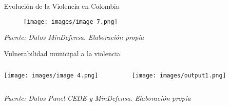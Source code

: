 


\begin{frame}{Evolución de la Violencia en Colombia}
    \begin{figure}[ht]
        \centering
        \texttt{[image: images/image 7.png]}
    \end{figure}
    \centering
    \footnotesize\textit{Fuente: Datos  MinDefensa. Elaboración propia}
\end{frame}

\begin{frame}{Vulnerabilidad municipal a la violencia}
    \begin{columns}[T]
        \begin{column}{0.48\textwidth}
            \centering
            \texttt{[image: images/image 4.png]}
        \end{column}
        
        \begin{column}{0.48\textwidth}
            \centering
            \texttt{[image: images/output1.png]}
        \end{column}
    \end{columns}
    \vspace{0.2cm}
    \centering
    \footnotesize\textit{Fuente: Datos Panel CEDE y MinDefensa. Elaboración propia}
\end{frame}



